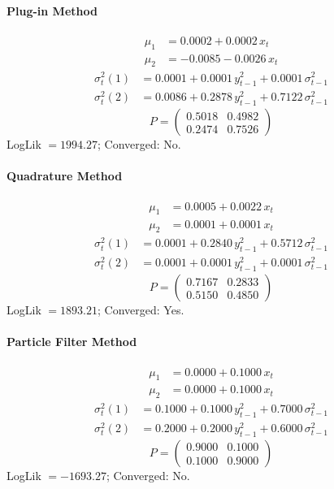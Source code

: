 \documentclass[11pt, a4paper]{article}
\begin{document}
\paragraph{Plug-in Method}
\begin{align}
\mu_{1} &= 0.0002 + 0.0002\, x_t \\
\mu_{2} &= -0.0085 -0.0026\, x_t
\end{align}
\begin{align}
\sigma^2_{t}(1) &= 0.0001 + 0.0001\, y_{t-1}^2 + 0.0001\, \sigma^2_{t-1} \\
\sigma^2_{t}(2) &= 0.0086 + 0.2878\, y_{t-1}^2 + 0.7122\, \sigma^2_{t-1}
\end{align}
\begin{equation}
P = \begin{pmatrix} 0.5018 & 0.4982 \\ 0.2474 & 0.7526 \end{pmatrix}
\end{equation}
LogLik $= 1994.27$; Converged: No.

\paragraph{Quadrature Method}
\begin{align}
\mu_{1} &= 0.0005 + 0.0022\, x_t \\
\mu_{2} &= 0.0001 + 0.0001\, x_t
\end{align}
\begin{align}
\sigma^2_{t}(1) &= 0.0001 + 0.2840\, y_{t-1}^2 + 0.5712\, \sigma^2_{t-1} \\
\sigma^2_{t}(2) &= 0.0001 + 0.0001\, y_{t-1}^2 + 0.0001\, \sigma^2_{t-1}
\end{align}
\begin{equation}
P = \begin{pmatrix} 0.7167 & 0.2833 \\ 0.5150 & 0.4850 \end{pmatrix}
\end{equation}
LogLik $= 1893.21$; Converged: Yes.

\paragraph{Particle Filter Method}
\begin{align}
\mu_{1} &= 0.0000 + 0.1000\, x_t \\
\mu_{2} &= 0.0000 + 0.1000\, x_t
\end{align}
\begin{align}
\sigma^2_{t}(1) &= 0.1000 + 0.1000\, y_{t-1}^2 + 0.7000\, \sigma^2_{t-1} \\
\sigma^2_{t}(2) &= 0.2000 + 0.2000\, y_{t-1}^2 + 0.6000\, \sigma^2_{t-1}
\end{align}
\begin{equation}
P = \begin{pmatrix} 0.9000 & 0.1000 \\ 0.1000 & 0.9000 \end{pmatrix}
\end{equation}
LogLik $= -1693.27$; Converged: No.
\end{document}
